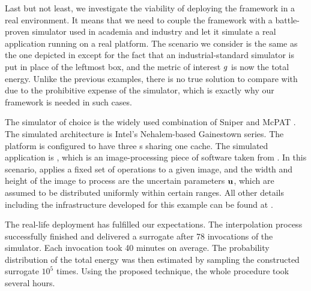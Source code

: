 Last but not least, we investigate the viability of deploying the framework in a
real environment. It means that we need to couple the framework with a
battle-proven simulator used in academia and industry and let it simulate a real
application running on a real platform. The scenario we consider is the same as
the one depicted in  except for the fact that an
industrial-standard simulator is put in place of the leftmost box, and the
metric of interest $g$ is now the total energy. Unlike the previous examples,
there is no true solution to compare with due to the prohibitive expense of the
simulator, which is exactly why our framework is needed in such cases.

The simulator of choice is the widely used combination of Sniper
\cite{carlson2011} and McPAT \cite{li2009}. The simulated architecture is
Intel's Nehalem-based Gainestown series. The platform is configured to have
three s sharing one  cache. The simulated application is
, which is an image-processing piece of software taken from 
\cite{bienia2011}. In this scenario,  applies a fixed set of operations
to a given image, and the width and height of the image to process are the
uncertain parameters $\mathbf{u}$, which are assumed to be distributed uniformly within
certain ranges. All other details including the infrastructure developed for
this example can be found at \cite{sources}.

The real-life deployment has fulfilled our expectations. The interpolation
process successfully finished and delivered a surrogate after 78 invocations of
the simulator. Each invocation took 40 minutes on average. The probability
distribution of the total energy was then estimated by sampling the constructed
surrogate $10^5$ times.  Using the proposed technique, the whole
procedure took several hours.
